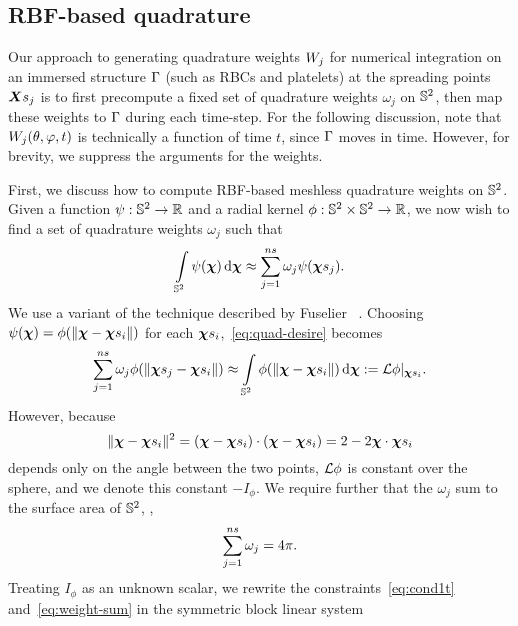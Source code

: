 \subsection{RBF-based quadrature}\label{sec:rbf-quadrature}

Our approach to generating quadrature weights $\weight[j]$ for numerical integration on an immersed structure
$\Gamma$ (such as RBCs and platelets) at the spreading points $\Xsj$ is to first precompute a fixed set of
quadrature weights $\omega_j$ on $\mathbb{S}^2$, then map these weights to $\Gamma$ during each time-step. For the
following discussion, note that $\weight[j](\theta, \varphi, t)$ is technically a function of time $t$, since
$\Gamma$ moves in time. However, for brevity, we suppress the arguments for the weights.

First, we discuss how to compute RBF-based meshless quadrature weights on $\mathbb{S}^2$. Given a function
$\psi:\mathbb{S}^2\to\mathbb{R}$ and a radial kernel $\phi:\mathbb{S}^2\times\mathbb{S}^2\to\mathbb{R}$, we now wish to find a set of quadrature
weights $\omega_j$ such that
\begin{equation}\label{eq:quad-desire}
    \int\limits_{\sphere} \psi(\Xp) \d\Xp \approx \sum_{j=1}^{\sample\cardinality} \omega_j \psi(\Xpsj).
\end{equation}
We use a variant of the technique described by Fuselier ~\cite{Fuselier:2013coba}.  Choosing
$\psi(\Xp) = \phi(\|\Xp-\sample\Xp_i\|)$ for each $\sample\Xp_i$,~\eqref{eq:quad-desire} becomes
\begin{equation}
    \sum_{j=1}^{\sample\cardinality} \omega_j \phi(\|\Xpsj-\sample\Xp_i\|)
    \approx \int\limits_{\sphere}\phi(\|\Xp-\sample\Xp_i\|) \d\Xp := \L\phi|_{\sample\Xp_i}.
    \label{eq:cond1t}
\end{equation}
However, because
\begin{equation}
    \|\Xp-\sample\Xp_i\|^2
        = (\Xp-\sample\Xp_i)\cdot(\Xp-\sample\Xp_i)
        = 2 - 2\Xp\cdot\sample\Xp_i
\end{equation}
depends only on the angle between the two points, $\mathcal{L}\phi$ is constant over the sphere, and we denote this constant $-I_\phi$. We require further that the $\omega_j$ sum to the
surface area of $\mathbb{S}^2$, ,
\begin{equation}\label{eq:weight-sum}
    \sum_{j=1}^{\sample\cardinality} \omega_j  = 4\pi.
\end{equation}
Treating $I_\phi$ as an unknown scalar, we rewrite the constraints~\eqref{eq:cond1t} and~\eqref{eq:weight-sum} in
the symmetric block linear system
